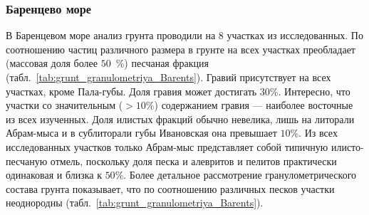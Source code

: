             \subsubsection{Баренцево море}
В Баренцевом море анализ грунта проводили на 8 участках из исследованных.
По соотношению частиц различного размера в грунте на всех участках преобладает (массовая доля более $50$~\%) песчаная фракция (табл.~\ref{tab:grunt_granulometriya_Barents}). 
Гравий присутствует на всех участках, кроме Пала-губы.  
Доля  гравия может достигать $30$\%. 
Интересно, что участки со значительным ($> 10\%$) содержанием   гравия  ---  наиболее   восточные   из   всех   изученных.   
Доля   илистых   фракций обычно   невелика,   лишь   на   литорали   Абрам-мыса   и   в   сублиторали   губы   Ивановская   она превышает   $10$\%.   
Из   всех   исследованных   участков   только   Абрам-мыс   представляет   собой типичную илисто-песчаную отмель, поскольку доля песка и алевритов и пелитов практически одинаковая и близка к $50$\%.
Более детальное рассмотрение гранулометрического состава грунта показывает, что по соотношению различных песков участки неоднородны (табл.~\ref{tab:grunt_granulometriya_Barents}).
